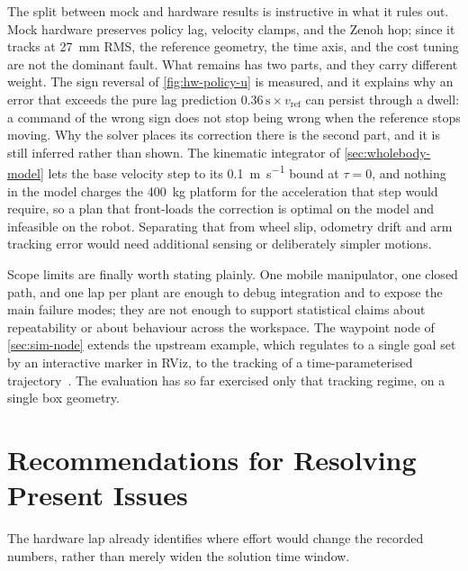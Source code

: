 The split between mock and hardware results is instructive in what it
rules out. Mock hardware preserves policy lag, velocity clamps, and the
Zenoh hop; since it tracks at \qty{27}{\milli\meter} RMS, the reference
geometry, the \ocs{} time axis, and the cost tuning are not the dominant
fault. What remains has two
parts, and they carry different weight. The sign reversal of
\cref{fig:hw-policy-u} is measured, and it explains why an error that
exceeds the pure lag prediction $0.36\,\mathrm{s}\times
v_{\mathrm{ref}}$ can persist through a dwell: a command of the wrong
sign does not stop being wrong when the reference stops moving. Why the
solver places its correction there is the second part, and it is still
inferred rather than shown. The kinematic integrator of
\cref{sec:wholebody-model} lets the base velocity step to its
\qty{0.1}{\meter\per\second} bound at $\tau=0$, and nothing in the model
charges the \qty{400}{\kilo\gram} platform for the acceleration that
step would require, so a plan that front-loads the correction is optimal
on the model and infeasible on the robot.
Separating that from wheel slip, odometry drift and arm tracking error
would need additional sensing or deliberately simpler motions.

Scope limits are finally worth stating plainly. One mobile manipulator,
one closed path, and one lap per plant are enough to debug integration
and to expose the main failure modes; they are not enough to support
statistical claims about repeatability or about behaviour across the
workspace. The waypoint node of \cref{sec:sim-node} extends the upstream
\ocs{} example, which regulates to a single goal set by an interactive
marker in RViz, to the tracking of a time-parameterised
trajectory~\cite{ocs2Toolbox}. The evaluation has so far exercised only
that tracking regime, on a single box geometry.

\section{Recommendations for Resolving Present Issues}
\label{sec:concl-recommendations}

The hardware lap already identifies where effort would change the
recorded numbers, rather than merely widen the solution time window.

